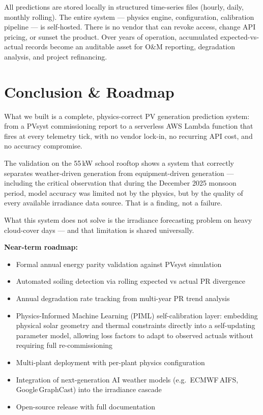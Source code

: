 \documentclass[11pt, a4paper]{article}
\begin{document}
All predictions are stored locally in structured time-series files (hourly,
daily, monthly rolling). The entire system --- physics engine, configuration,
calibration pipeline --- is self-hosted. There is no vendor that can
revoke access, change API pricing, or sunset the product. Over years of
operation, accumulated expected-vs-actual records become an auditable asset
for O\&M reporting, degradation analysis, and project refinancing.

\section{Conclusion \& Roadmap}

What we built is a complete, physics-correct PV generation prediction
system: from a PVsyst commissioning report to a serverless AWS Lambda
function that fires at every telemetry tick, with no vendor lock-in,
no recurring API cost, and no accuracy compromise.

The validation on the 55\,kW school rooftop shows a system that correctly
separates weather-driven generation from equipment-driven generation ---
including the critical observation that during the December 2025 monsoon
period, model accuracy was limited not by the physics, but by the quality
of every available irradiance data source. That is a finding, not a failure.

What this system does not solve is the irradiance forecasting problem on
heavy cloud-cover days --- and that limitation is shared universally.

\textbf{Near-term roadmap:}
\begin{itemize}
  \item Formal annual energy parity validation against PVsyst simulation
  \item Automated soiling detection via rolling expected vs actual PR divergence
  \item Annual degradation rate tracking from multi-year PR trend analysis
  \item Physics-Informed Machine Learning (PIML) self-calibration layer:
    embedding physical solar geometry and thermal constraints directly into
    a self-updating parameter model, allowing loss factors to adapt to
    observed actuals without requiring full re-commissioning
  \item Multi-plant deployment with per-plant physics configuration
  \item Integration of next-generation AI weather models (e.g.\ ECMWF\,AIFS,
    Google\,GraphCast) into the irradiance cascade
  \item Open-source release with full documentation
\end{itemize}
\end{document}
